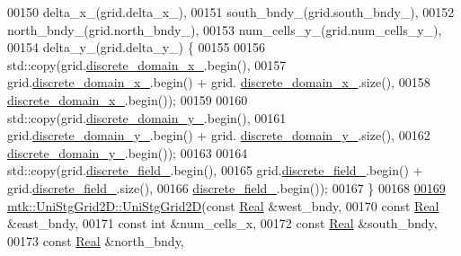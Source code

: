 \begin{DoxyCode}
00150     delta\_x\_(grid.delta\_x\_),
00151     south\_bndy\_(grid.south\_bndy\_),
00152     north\_bndy\_(grid.north\_bndy\_),
00153     num\_cells\_y\_(grid.num\_cells\_y\_),
00154     delta\_y\_(grid.delta\_y\_) \{
00155 
00156     std::copy(grid.\hyperlink{classmtk_1_1UniStgGrid2D_ab15979865852583a46662ea592f27a4f}{discrete\_domain\_x\_}.begin(),
00157               grid.\hyperlink{classmtk_1_1UniStgGrid2D_ab15979865852583a46662ea592f27a4f}{discrete\_domain\_x\_}.begin() + grid.
      \hyperlink{classmtk_1_1UniStgGrid2D_ab15979865852583a46662ea592f27a4f}{discrete\_domain\_x\_}.size(),
00158               \hyperlink{classmtk_1_1UniStgGrid2D_ab15979865852583a46662ea592f27a4f}{discrete\_domain\_x\_}.begin());
00159 
00160     std::copy(grid.\hyperlink{classmtk_1_1UniStgGrid2D_ad69f93d4b27707d97f209b907383a7a2}{discrete\_domain\_y\_}.begin(),
00161               grid.\hyperlink{classmtk_1_1UniStgGrid2D_ad69f93d4b27707d97f209b907383a7a2}{discrete\_domain\_y\_}.begin() + grid.
      \hyperlink{classmtk_1_1UniStgGrid2D_ad69f93d4b27707d97f209b907383a7a2}{discrete\_domain\_y\_}.size(),
00162               \hyperlink{classmtk_1_1UniStgGrid2D_ad69f93d4b27707d97f209b907383a7a2}{discrete\_domain\_y\_}.begin());
00163 
00164     std::copy(grid.\hyperlink{classmtk_1_1UniStgGrid2D_ad7474b2669ee988b84aed20b7f5dc7be}{discrete\_field\_}.begin(),
00165               grid.\hyperlink{classmtk_1_1UniStgGrid2D_ad7474b2669ee988b84aed20b7f5dc7be}{discrete\_field\_}.begin() + grid.\hyperlink{classmtk_1_1UniStgGrid2D_ad7474b2669ee988b84aed20b7f5dc7be}{discrete\_field\_}.size(),
00166               \hyperlink{classmtk_1_1UniStgGrid2D_ad7474b2669ee988b84aed20b7f5dc7be}{discrete\_field\_}.begin());
00167 \}
00168 
\hypertarget{mtk__uni__stg__grid__2d_8cc_source_l00169}{}\hyperlink{classmtk_1_1UniStgGrid2D_ad8813b1ffcf23bb759f59f8524702e80}{00169} \hyperlink{classmtk_1_1UniStgGrid2D_a40db9a6d21e0f4cf70c478fcc3b94531}{mtk::UniStgGrid2D::UniStgGrid2D}(\textcolor{keyword}{const} \hyperlink{group__c01-roots_gac080bbbf5cbb5502c9f00405f894857d}{Real} &west\_bndy,
00170                                 \textcolor{keyword}{const} \hyperlink{group__c01-roots_gac080bbbf5cbb5502c9f00405f894857d}{Real} &east\_bndy,
00171                                 \textcolor{keyword}{const} \textcolor{keywordtype}{int} &num\_cells\_x,
00172                                 \textcolor{keyword}{const} \hyperlink{group__c01-roots_gac080bbbf5cbb5502c9f00405f894857d}{Real} &south\_bndy,
00173                                 \textcolor{keyword}{const} \hyperlink{group__c01-roots_gac080bbbf5cbb5502c9f00405f894857d}{Real} &north\_bndy,

\end{DoxyCode}
